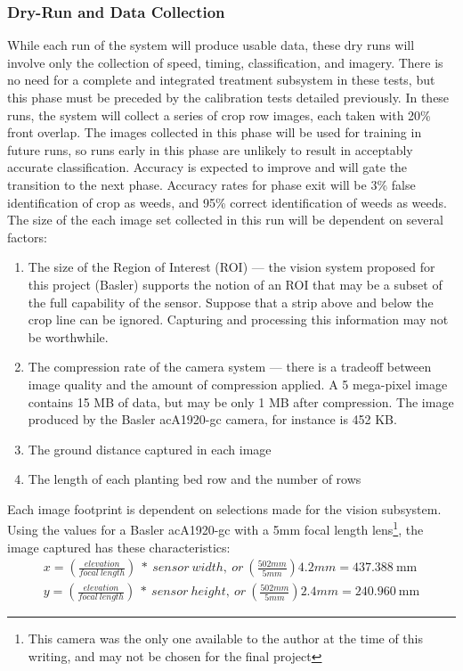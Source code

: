 \documentclass[12pt]{article}
\begin{document}
\subsubsection{Dry-Run and Data Collection}
While each run of the system will produce usable data, these dry runs will involve only the collection of speed, timing, classification, and imagery. There is no need for a complete and integrated treatment subsystem in these tests, but this phase must be preceded by the calibration tests detailed previously.
 In these runs, the system will collect a series of crop row images, each taken with 20\% front overlap. The images collected in this phase will be used for training in future runs, so runs early in this phase are unlikely to result in acceptably accurate classification. Accuracy is expected to improve and will gate the transition to the next phase. Accuracy rates for phase exit will be 3\% false identification of crop as weeds, and 95\% correct identification of weeds as weeds.
The size of the each image set collected in this run will be dependent on several factors:
\begin{enumerate}
	\item{The size of the Region of Interest (ROI) --- the vision system proposed for this project (Basler) supports the notion of an ROI that may be a subset of the full capability of the sensor. Suppose that a strip above and below the crop line can be ignored. Capturing and processing this information may not be worthwhile.}
	\item{The compression rate of the camera system --- there is a tradeoff between image quality and the amount of compression applied. A 5 mega-pixel image contains 15 MB of data, but may be only 1 MB after compression. The image produced by the Basler acA1920-gc camera, for instance is 452 KB.}
	\item{The ground distance captured in each image}
	\item{The length of each planting bed row and the number of rows}
\end{enumerate}
Each image footprint is dependent on selections made for the vision subsystem. Using the values for a Basler acA1920-gc with a 5mm focal length lens\footnote{This camera was the only one available to the author at the time of this writing, and may not be chosen for the final project}, the image captured has these characteristics:
\begin{align}
	x = \left( \frac {elevation} {focal\ length} \right) \ *\ sensor\ width,\ or\ \left( \frac {502mm} {5mm} \right) 4.2mm = \SI{437.388}{\milli\meter} \\
	y = \left( \frac {elevation} {focal\ length} \right) \ *\ sensor\ height,\ or\ \left( \frac {502mm} {5mm} \right) 2.4mm = \SI{240.960}{\milli\meter}
\end{align}
\end{document}
